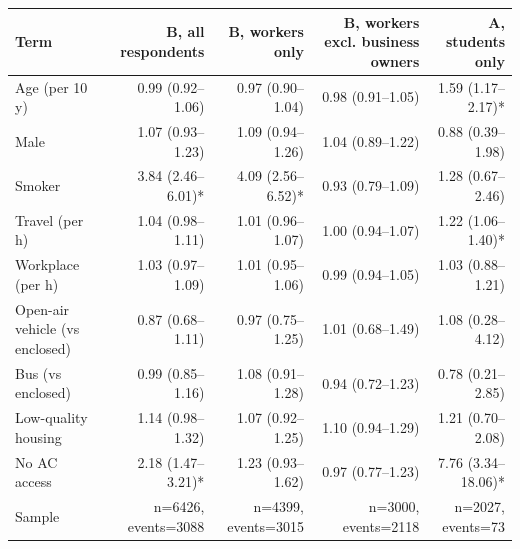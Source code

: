 \begin{tabular}{lrrrr}
\toprule
Term & B, all respondents & B, workers only & B, workers excl. business owners & A, students only \\
\midrule
Age (per 10 y) & 0.99 (0.92--1.06) & 0.97 (0.90--1.04) & 0.98 (0.91--1.05) & 1.59 (1.17--2.17)* \\
Male & 1.07 (0.93--1.23) & 1.09 (0.94--1.26) & 1.04 (0.89--1.22) & 0.88 (0.39--1.98) \\
Smoker & 3.84 (2.46--6.01)* & 4.09 (2.56--6.52)* & 0.93 (0.79--1.09) & 1.28 (0.67--2.46) \\
Travel (per h) & 1.04 (0.98--1.11) & 1.01 (0.96--1.07) & 1.00 (0.94--1.07) & 1.22 (1.06--1.40)* \\
Workplace (per h) & 1.03 (0.97--1.09) & 1.01 (0.95--1.06) & 0.99 (0.94--1.05) & 1.03 (0.88--1.21) \\
Open-air vehicle (vs enclosed) & 0.87 (0.68--1.11) & 0.97 (0.75--1.25) & 1.01 (0.68--1.49) & 1.08 (0.28--4.12) \\
Bus (vs enclosed) & 0.99 (0.85--1.16) & 1.08 (0.91--1.28) & 0.94 (0.72--1.23) & 0.78 (0.21--2.85) \\
Low-quality housing & 1.14 (0.98--1.32) & 1.07 (0.92--1.25) & 1.10 (0.94--1.29) & 1.21 (0.70--2.08) \\
No AC access & 2.18 (1.47--3.21)* & 1.23 (0.93--1.62) & 0.97 (0.77--1.23) & 7.76 (3.34--18.06)* \\
\midrule
Sample & n=6426, events=3088 & n=4399, events=3015 & n=3000, events=2118 & n=2027, events=73 \\
\bottomrule
\end{tabular}
